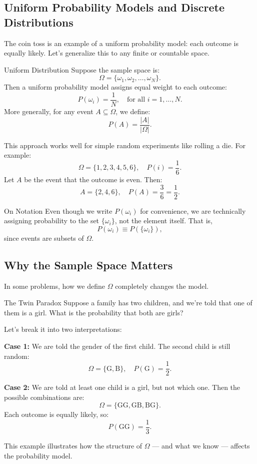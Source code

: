 \subsection{Uniform Probability Models and Discrete Distributions}

The coin toss is an example of a uniform probability model: each outcome is equally likely. Let’s generalize this to any finite or countable space.

\begin{eg}{Uniform Distribution}
Suppose the sample space is:
\[
\Omega = \{\omega_1, \omega_2, \dots, \omega_N\}.
\]
Then a uniform probability model assigns equal weight to each outcome:
\[
P(\omega_i) = \frac{1}{N}, \quad \text{for all } i = 1, \dots, N.
\]
More generally, for any event \( A \subseteq \Omega \), we define:
\[
P(A) = \frac{|A|}{|\Omega|}.
\]

\noindent This approach works well for simple random experiments like rolling a die. For example:
\[
\Omega = \{1, 2, 3, 4, 5, 6\}, \quad P(i) = \frac{1}{6}.
\]
Let $A$ be the event that the outcome is even. Then:
\[
A = \{2, 4, 6\}, \quad P(A) = \frac{3}{6} = \frac{1}{2}.
\]
\end{eg}

\begin{rmk}{On Notation}
Even though we write $P(\omega_i)$ for convenience, we are technically assigning probability to the set $\{\omega_i\}$, not the element itself. That is,
\[
P(\omega_i) \equiv P(\{\omega_i\}),
\]
since events are subsets of $\Omega$.
\end{rmk}



\subsection{Why the Sample Space Matters}

In some problems, how we define $\Omega$ completely changes the model.

\begin{eg}{The Twin Paradox}
Suppose a family has two children, and we’re told that one of them is a girl. What is the probability that both are girls?

Let’s break it into two interpretations:

\textbf{Case 1:} We are told the gender of the first child. The second child is still random:
\[
\Omega = \{\text{G}, \text{B}\}, \quad P(\text{G}) = \frac{1}{2}.
\]

\textbf{Case 2:} We are told at least one child is a girl, but not which one. Then the possible combinations are:
\[
\Omega = \{\text{GG}, \text{GB}, \text{BG}\}.
\]
Each outcome is equally likely, so:
\[
P(\text{GG}) = \frac{1}{3}.
\]

This example illustrates how the structure of $\Omega$ — and what we know — affects the probability model.
\end{eg}


